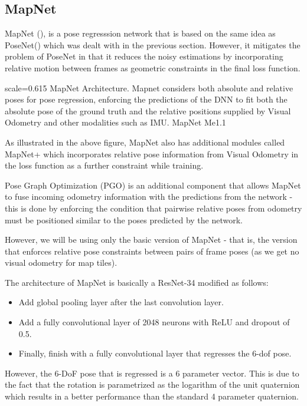 \subsection{MapNet}
MapNet (\cite{Brahmbhatt2018}), is a pose regresssion network that is based on the same idea as PoseNet(\cite{Kendall2015}) which was dealt with in the previous section. However, it mitigates the problem of PoseNet in that it reduces the noisy estimations by incorporating relative motion between frames as geometric constraints in the final loss function. 

{scale=0.615}%
{MapNet Architecture. Mapnet considers both absolute and relative poses for pose regression, enforcing the predictions of the DNN to fit both the absolute pose of the ground truth and the relative positions supplied by Visual Odometry and other modalities such as IMU.}%
{MapNet}%
{Me1.1}

As illustrated in the above figure, MapNet also has additional modules called MapNet+ which incorporates relative pose information from Visual Odometry in the loss function as a further constraint while training. 

Pose Graph Optimization (PGO) is an additional component that allows MapNet to fuse incoming odometry information with the predictions from the network - this is done by enforcing the condition that pairwise relative poses from odometry must be positioned similar to the poses predicted by the network.

However, we will be using only the basic version of MapNet - that is, the version 
that enforces relative pose constraints between pairs of frame poses (as we get no visual odometry for map tiles).

The architecture of MapNet is basically a ResNet-34 modified as follows:
\begin{itemize}
	\item Add global pooling layer after the last convolution layer.
	\item Add a fully convolutional layer of 2048 neurons with ReLU and dropout of 0.5.
	\item Finally, finish with a fully convolutional layer that regresses the 6-dof pose. 
\end{itemize} 

However, the 6-DoF pose that is regressed is a 6 parameter vector. This is due to the fact that the rotation is parametrized as the logarithm of the unit quaternion which results in a better performance than the standard 4 parameter quaternion. 

